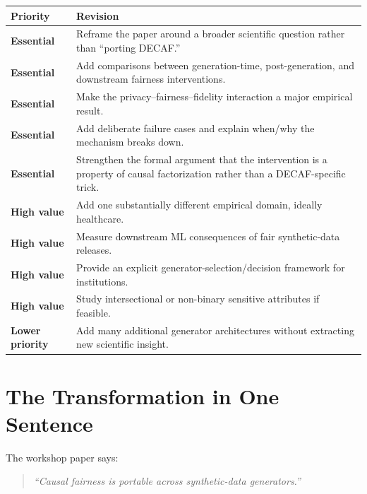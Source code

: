 \documentclass[11pt]{article}
\begin{document}
\begin{longtable}{p{}p{}}
\toprule
Priority & Revision \\
\midrule
\textbf{Essential} &
Reframe the paper around a broader scientific question rather than ``porting DECAF.'' \\[4pt]

\textbf{Essential} &
Add comparisons between generation-time, post-generation, and downstream fairness interventions. \\[4pt]

\textbf{Essential} &
Make the privacy--fairness--fidelity interaction a major empirical result. \\[4pt]

\textbf{Essential} &
Add deliberate failure cases and explain when/why the mechanism breaks down. \\[4pt]

\textbf{Essential} &
Strengthen the formal argument that the intervention is a property of causal factorization rather than a DECAF-specific trick. \\[4pt]

\textbf{High value} &
Add one substantially different empirical domain, ideally healthcare. \\[4pt]

\textbf{High value} &
Measure downstream ML consequences of fair synthetic-data releases. \\[4pt]

\textbf{High value} &
Provide an explicit generator-selection/decision framework for institutions. \\[4pt]

\textbf{High value} &
Study intersectional or non-binary sensitive attributes if feasible. \\[4pt]

\textbf{Lower priority} &
Add many additional generator architectures without extracting new scientific insight. \\
\bottomrule
\end{longtable}

\section*{The Transformation in One Sentence}

The workshop paper says:

\begin{quote}
\emph{``Causal fairness is portable across synthetic-data generators.''}
\end{quote}
\end{document}
